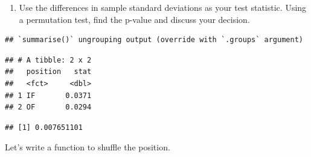 \documentclass[
]{book}
\newenvironment{Shaded}{\begin{snugshade}}{\end{snugshade}}
\newcommand{\ControlFlowTok}[1]{\textcolor[rgb]{0.13,0.29,0.53}{\textbf{#1}}}
\newcommand{\DataTypeTok}[1]{\textcolor[rgb]{0.13,0.29,0.53}{#1}}
\newcommand{\KeywordTok}[1]{\textcolor[rgb]{0.13,0.29,0.53}{\textbf{#1}}}
\newcommand{\NormalTok}[1]{#1}
\newcommand{\OperatorTok}[1]{\textcolor[rgb]{0.81,0.36,0.00}{\textbf{#1}}}
\newcommand{\StringTok}[1]{\textcolor[rgb]{0.31,0.60,0.02}{#1}}
\providecommand{\tightlist}{%
  \setlength{\itemsep}{0pt}\setlength{\parskip}{0pt}}
\begin{document}
\begin{enumerate}
\def\labelenumi{\alph{enumi}.}
\setcounter{enumi}{2}
\tightlist
\item
  Use the differences in sample standard deviations as your test statistic. Using a permutation test, find the p-value and discuss your decision.
\end{enumerate}

\begin{Shaded}
\end{Shaded}

\begin{verbatim}
## `summarise()` ungrouping output (override with `.groups` argument)
\end{verbatim}

\begin{verbatim}
## # A tibble: 2 x 2
##   position   stat
##   <fct>     <dbl>
## 1 IF       0.0371
## 2 OF       0.0294
\end{verbatim}

\begin{Shaded}
\end{Shaded}

\begin{verbatim}
## [1] 0.007651101
\end{verbatim}

Let's write a function to shuffle the position.

\begin{Shaded}
\end{Shaded}
\end{document}
